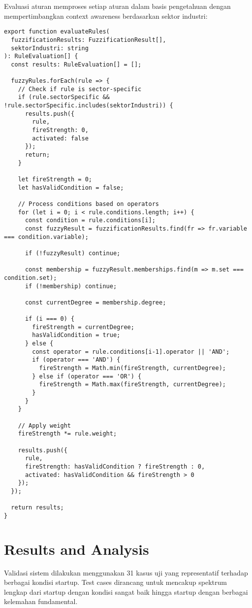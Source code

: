 \documentclass{article}
\begin{document}
Evaluasi aturan memproses setiap aturan dalam basis pengetahuan dengan mempertimbangkan context awareness berdasarkan sektor industri:

\begin{verbatim}
export function evaluateRules(
  fuzzificationResults: FuzzificationResult[], 
  sektorIndustri: string
): RuleEvaluation[] {
  const results: RuleEvaluation[] = [];
  
  fuzzyRules.forEach(rule => {
    // Check if rule is sector-specific
    if (rule.sectorSpecific && !rule.sectorSpecific.includes(sektorIndustri)) {
      results.push({
        rule,
        fireStrength: 0,
        activated: false
      });
      return;
    }
    
    let fireStrength = 0;
    let hasValidCondition = false;
    
    // Process conditions based on operators
    for (let i = 0; i < rule.conditions.length; i++) {
      const condition = rule.conditions[i];
      const fuzzyResult = fuzzificationResults.find(fr => fr.variable === condition.variable);
      
      if (!fuzzyResult) continue;
      
      const membership = fuzzyResult.memberships.find(m => m.set === condition.set);
      if (!membership) continue;
      
      const currentDegree = membership.degree;
      
      if (i === 0) {
        fireStrength = currentDegree;
        hasValidCondition = true;
      } else {
        const operator = rule.conditions[i-1].operator || 'AND';
        if (operator === 'AND') {
          fireStrength = Math.min(fireStrength, currentDegree);
        } else if (operator === 'OR') {
          fireStrength = Math.max(fireStrength, currentDegree);
        }
      }
    }
    
    // Apply weight
    fireStrength *= rule.weight;
    
    results.push({
      rule,
      fireStrength: hasValidCondition ? fireStrength : 0,
      activated: hasValidCondition && fireStrength > 0
    });
  });
  
  return results;
}
\end{verbatim}

\section{Results and Analysis}

Validasi sistem dilakukan menggunakan 31 kasus uji yang representatif terhadap berbagai kondisi startup. Test cases dirancang untuk mencakup spektrum lengkap dari startup dengan kondisi sangat baik hingga startup dengan berbagai kelemahan fundamental.
\end{document}
